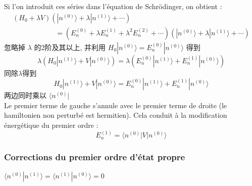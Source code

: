 \documentclass{article}
\begin{document}
Si l'on introduit ces s\'eries dans l'\'equation de Schr\"odinger, on obtient :
$$
\begin{matrix}
\left(H_0 + \lambda V \right) \left(|n^{(0)}\rangle + \lambda |n^{(1)}\rangle + \cdots \right) \qquad\qquad\qquad\qquad\\
\qquad\qquad\qquad= \left(E_n^{(0)} + \lambda E_n^{(1)} + \lambda^2 E_n^{(2)} + \cdots \right) \left(|n^{(0)}\rangle + \lambda |n^{(1)}\rangle + \cdots \right)
\end{matrix}
$$
忽略掉 $\lambda$ 的2阶及其以上, 并利用
$H_0 |n^{(0)}\rangle = E_n^{(0)} |n^{(0)}\rangle$
得到
$$ \lambda(H_0 |n^{(1)}\rangle + V |n^{(0)}\rangle) = \lambda(E_n^{(0)} |n^{(1)}\rangle + E_n^{(1)} |n^{(0)}\rangle) $$
同除$\lambda$得到
\begin{equation}
H_0 |n^{(1)}\rangle + V |n^{(0)}\rangle = E_n^{(0)} |n^{(1)}\rangle + E_n^{(1)} |n^{(0)}\rangle
\label{eq.approximation.perturbation.ordre.1}
\end{equation}
两边同时乘以 $\scriptstyle \langle n^{(0)}|$\\
Le premier terme de gauche s'annule avec le premier terme de droite (le hamiltonien non perturb\'e est hermitien). Cela conduit \`a la modification \'energ\'etique du premier ordre :
\begin{equation}
E_n^{(1)} = \langle n^{(0)} | V | n^{(0)} \rangle
\end{equation}

\subsubsection{Corrections du premier ordre d'\'etat propre}
$\langle n^{(0)}| n^{(1)}\rangle  = \langle n^{(1)}|n^{(0)}\rangle = 0$
\end{document}
